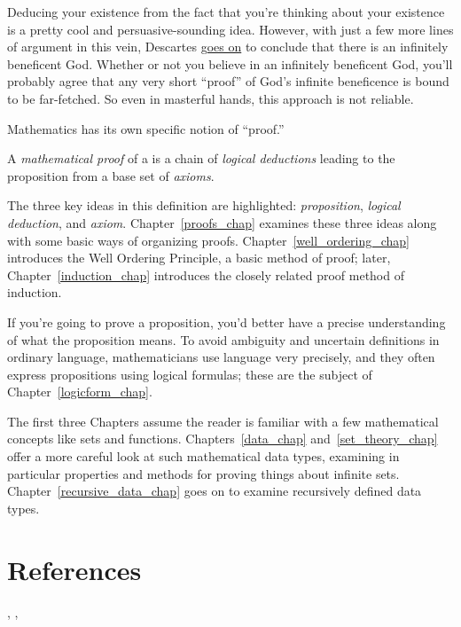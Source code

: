 Deducing your existence from the fact that you're thinking about your
existence is a pretty cool and persuasive-sounding idea.  However,
with just a few more lines of argument in this vein, Descartes
\href{http://www.btinternet.com/~glynhughes/squashed/descartes.htm}{goes
  on} to conclude that there is an infinitely beneficent God.  Whether
or not you believe in an infinitely beneficent God, you'll probably
agree that any very short ``proof'' of God's infinite beneficence is
bound to be far-fetched.  So even in masterful hands, this approach is
not reliable.

Mathematics has its own specific notion of ``proof.''

\begin{definition*}
A \emph{mathematical proof} of a  is a chain of \emph{logical
deductions} leading to the proposition from a base set of%
\emph{axioms}.
\end{definition*}

The three key ideas in this definition are highlighted:
\emph{proposition}, \emph{logical deduction}, and \emph{axiom}.
Chapter~\ref{proofs_chap} examines these three ideas along with some
basic ways of organizing proofs.  Chapter~\ref{well_ordering_chap}
introduces the Well Ordering Principle, a basic method of proof; later,
Chapter~\ref{induction_chap} introduces the closely related proof
method of induction.

If you're going to prove a proposition, you'd better have a precise
understanding of what the proposition means.  To avoid ambiguity and
uncertain definitions in ordinary language, mathematicians use
language very precisely, and they often express propositions using
logical formulas; these are the subject of
Chapter~\ref{logicform_chap}.

The first three Chapters assume the reader is familiar with a few
mathematical concepts like sets and functions.
Chapters~\ref{data_chap} and~\ref{set_theory_chap} offer a more
careful look at such mathematical data types, examining in particular
properties and methods for proving things about infinite sets.
Chapter~\ref{recursive_data_chap} goes on to examine recursively
defined data types.

\iffalse
Number theory is the study of properties of the integers.  This part
of the text ends with Chapter~\ref{number_theory_chap} on Number
theory because there are lots of easy-to-state and
interesting-to-prove properties of numbers.  This subject was once
thought to have few, if any, practical applications, but it has turned
out to have multiple applications in Computer Science.  For example,
most modern data encryption methods are based on Number theory.
\fi


\section{References}
 \cite{Cupillari12},
 \cite{Velleman1994},
 \cite{AignerG99}     %

\endinput
